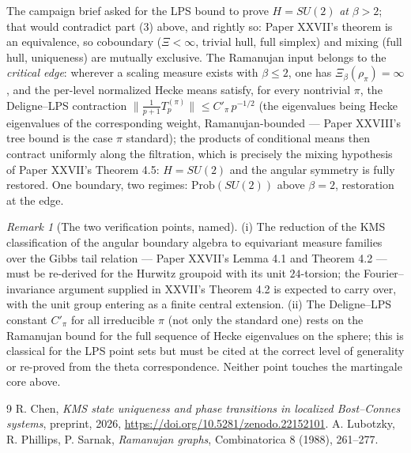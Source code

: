 \documentclass[11pt]{amsart}
\theoremstyle{remark}
\newtheorem{remark}[theorem]{Remark}
\newcommand{\Prob}{\mathrm{Prob}}
\begin{document}
The campaign brief asked for the LPS bound to prove $H=SU(2)$ \emph{at} $\beta>2$; that
would contradict part (3) above, and rightly so: Paper XXVII's theorem is an
equivalence, so coboundary ($\Xi<\infty$, trivial hull, full simplex) and mixing (full
hull, uniqueness) are mutually exclusive. The Ramanujan input belongs to the
\emph{critical edge}: wherever a scaling measure exists with $\beta\le2$, one has
$\Xi_\beta(\rho_\pi)=\infty$, and the per-level normalized Hecke means satisfy, for
every nontrivial $\pi$, the Deligne--LPS contraction \cite{LPS}
$\bigl\|\tfrac1{p+1}T_p^{(\pi)}\bigr\|_{}\le C'_\pi\,p^{-1/2}$
(the eigenvalues being Hecke eigenvalues of the corresponding weight, Ramanujan-bounded
--- Paper XXVIII's tree bound is the case $\pi$ standard); the products of conditional
means then contract uniformly along the filtration, which is precisely the mixing
hypothesis of Paper XXVII's Theorem 4.5: $H=SU(2)$ and the angular symmetry is fully
restored. One boundary, two regimes: $\Prob(SU(2))$ above $\beta=2$, restoration at the
edge.

\begin{remark}[The two verification points, named]\label{rem:honest}
(i) The reduction of the KMS classification of the angular boundary algebra to
equivariant measure families over the Gibbs tail relation --- Paper XXVII's Lemma 4.1
and Theorem 4.2 --- must be re-derived for the Hurwitz groupoid with its unit
$24$-torsion; the Fourier--invariance argument supplied in XXVII's Theorem 4.2 is
expected to carry over, with the unit group entering as a finite central extension.
(ii) The Deligne--LPS constant $C'_\pi$ for all irreducible $\pi$ (not only the standard
one) rests on the Ramanujan bound for the full sequence of Hecke eigenvalues on the
sphere; this is classical for the LPS point sets but must be cited at the correct level
of generality or re-proved from the theta correspondence. Neither point touches the
martingale core above.
\end{remark}

\begin{thebibliography}{9}
 R. Chen, \emph{KMS state uniqueness and phase transitions in localized Bost--Connes systems}, preprint, 2026, \newline\url{https://doi.org/10.5281/zenodo.22152101}.
 A. Lubotzky, R. Phillips, P. Sarnak, \emph{Ramanujan graphs}, Combinatorica 8 (1988), 261--277.
\end{thebibliography}
\end{document}
